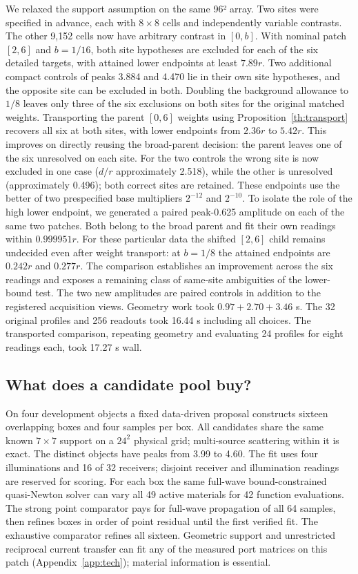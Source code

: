 We relaxed the support assumption on the same 96² array. Two sites were specified in advance, each with $8\times8$ cells and independently variable contrasts. The other 9,152 cells now have arbitrary contrast in $[0,b]$. With nominal patch $[2,6]$ and $b=1/16$, both site hypotheses are excluded for each of the six detailed targets, with attained lower endpoints at least $7.89r$. Two additional compact controls of peaks 3.884 and 4.470 lie in their own site hypotheses, and the opposite site can be excluded in both. Doubling the background allowance to $1/8$ leaves only three of the six exclusions on both sites for the original matched weights. Transporting the parent $[0,6]$ weights using Proposition~\ref{th:transport} recovers all six at both sites, with lower endpoints from $2.36r$ to $5.42r$. This improves on directly reusing the broad-parent decision: the parent leaves one of the six unresolved on each site. For the two controls the wrong site is now excluded in one case ($d/r$ approximately 2.518), while the other is unresolved (approximately 0.496); both correct sites are retained. These endpoints use the better of two prespecified base multipliers $2^{-12}$ and $2^{-10}$. To isolate the role of the high lower endpoint, we generated a paired peak-0.625 amplitude on each of the same two patches. Both belong to the broad parent and fit their own readings within $0.999951r$. For these particular data the shifted $[2,6]$ child remains undecided even after weight transport: at $b=1/8$ the attained endpoints are $0.242r$ and $0.277r$. The comparison establishes an improvement across the six readings and exposes a remaining class of same-site ambiguities of the lower-bound test. The two new amplitudes are paired controls in addition to the registered acquisition views. Geometry work took $0.97+2.70+3.46$ s. The 32 original profiles and 256 readouts took 16.44 s including all choices. The transported comparison, repeating geometry and evaluating 24 profiles for eight readings each, took 17.27 s wall.

\subsection{What does a candidate pool buy?}
On four development objects a fixed data-driven proposal constructs sixteen overlapping boxes and four samples per box. All candidates share the same known $7\times7$ support on a $24^2$ physical grid; multi-source scattering within it is exact. The distinct objects have peaks from 3.99 to 4.60. The fit uses four illuminations and 16 of 32 receivers; disjoint receiver and illumination readings are reserved for scoring. For each box the same full-wave bound-constrained quasi-Newton solver can vary all 49 active materials for 42 function evaluations. The strong point comparator pays for full-wave propagation of all 64 samples, then refines boxes in order of point residual until the first verified fit. The exhaustive comparator refines all sixteen. Geometric support and unrestricted reciprocal current transfer can fit any of the measured port matrices on this patch (Appendix~\ref{app:tech}); material information is essential.

